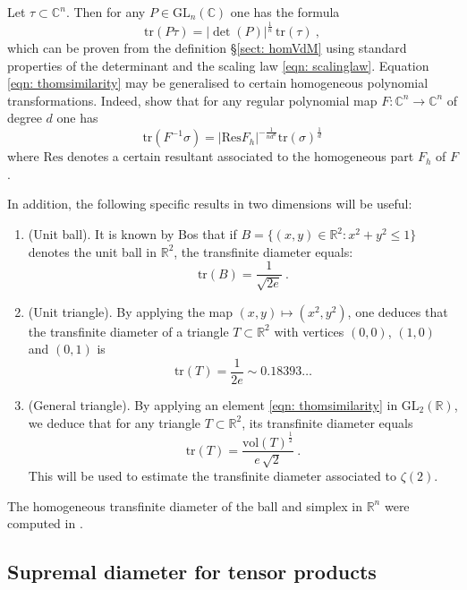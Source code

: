\documentclass[a4paper,10pt]{amsart}
\theoremstyle{definition}
\theoremstyle{remark}
\numberwithin{equation}{section}
\newcommand{\C}{\mathbb C}
\newcommand{\R}{\mathbb R}
\newcommand{\tr}{\mathrm{tr}}
\newcommand{\0}{\color{blue}{\mathsf{0}}}
\begin{document}
  Let $\tau \subset \C^n$. Then for any $P \in \mathrm{GL}_n(\C)$ one has the formula
  \begin{equation} \label{eqn: thomsimilarity}   \tr(P  \tau) =  |\det(P)|^{\frac{1}{n}}\,  \tr(\tau)\ ,  \end{equation} 
  which can  be proven from the definition \S\ref{sect: homVdM} using standard  properties of the determinant and the scaling law \eqref{eqn: scalinglaw}.
  Equation \eqref{eqn: thomsimilarity} may be generalised to certain homogeneous polynomial transformations. Indeed,  \cite{BloomCalvi, DeMarcoRumely} show that
  for any regular polynomial map $F: \C^n \rightarrow \C^n$ of degree $d$ one has
  \[  \tr (F^{-1} \sigma) = |\mathrm{Res} F_h|^{-\frac{1}{nd^n}}  \tr(\sigma)^{\frac{1}{d}}\]
   where $\mathrm{Res}$ denotes a certain resultant associated to  the homogeneous part $F_h$ of  $F$.
   
   
  
  
  In addition, the   following specific results in two dimensions will be useful:
  \begin{enumerate}
  \item (Unit ball). It is known by Bos  \cite{Bos}  that if $B= \{(x,y) \in \R^2: x^2+y^2 \leq 1\}$ denotes the unit ball in $\R^2$,   the transfinite diameter equals:
\[   \tr(B) =  \frac{1}{\sqrt{2e}}\ .  \]
\item (Unit triangle).
By applying the map $(x,y) \mapsto (x^2, y^2)$, one  deduces  \cite[p. 302]{BloomCalvi} that   the transfinite diameter of a triangle $T\subset \R^2$ with vertices $(0,0)$, $(1,0)$ and $(0,1)$ is 
\[ \tr(T) = \frac{1}{2e} \sim 0.18393\ldots \]

\item (General triangle). 
By applying an element  \eqref{eqn: thomsimilarity} in $\mathrm{GL}_2(\R)$,  we deduce  that for any triangle $T\subset \R^2$, its transfinite diameter equals
\begin{equation}  \label{eqn: transfinitetriangle}  \tr(T) =  \frac{\mathrm{vol}(T)^{\frac{1}{2}} }{ e \, \sqrt{2} }\ .
\end{equation} 
This  will be used to estimate the transfinite diameter associated to $\zeta(2)$.
  \end{enumerate} 
  The homogeneous transfinite diameter of the ball and simplex in $\R^n$ were computed in \cite{BloomBosLevenberg}.  
    
  \subsection{Supremal  diameter for tensor products}
\end{document}
